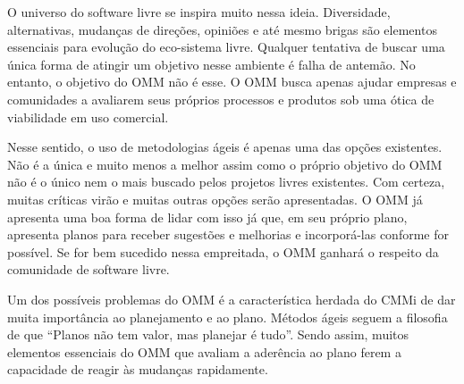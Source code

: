 O universo do software livre se inspira muito nessa
ideia. Diversidade, alternativas, mudanças de direções, opiniões e até
mesmo brigas são elementos essenciais para evolução do eco-sistema
livre. Qualquer tentativa de buscar uma única forma de atingir um
objetivo nesse ambiente é falha de antemão. No entanto, o objetivo do
OMM não é esse. O OMM busca apenas ajudar empresas e comunidades a
avaliarem seus próprios processos e produtos sob uma ótica de
viabilidade em uso comercial.

Nesse sentido, o uso de metodologias ágeis é apenas uma das opções
existentes.  Não é a única e muito menos a melhor assim como o próprio
objetivo do OMM não é o único nem o mais buscado pelos projetos livres
existentes. Com certeza, muitas críticas virão e muitas outras opções
serão apresentadas. O OMM já apresenta uma boa forma de lidar com isso
já que, em seu próprio plano, apresenta planos para receber sugestões
e melhorias e incorporá-las conforme for possível.  Se for bem
sucedido nessa empreitada, o OMM ganhará o respeito da comunidade de
software livre.


Um dos possíveis problemas do OMM é a característica herdada do CMMi
de dar muita importância ao planejamento e ao plano. Métodos ágeis
seguem a filosofia de que ``Planos não tem valor, mas planejar é
tudo''. Sendo assim, muitos elementos essenciais do OMM que avaliam a
aderência ao plano ferem a capacidade de reagir às mudanças
rapidamente.

